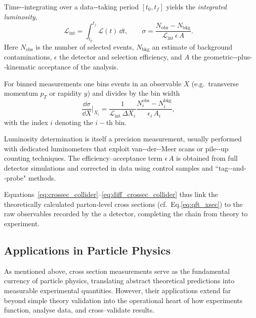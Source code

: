 \begin{definition}
        Time-‑integrating over a data‑-taking period \([t_0, t_f]\) yields the \emph{integrated luminosity},
        \begin{equation}
          \mathcal{L}_{\text{int}}
          = \int_{t_0}^{t_f} \mathcal{L}(t)\,\dd t,
          \qquad
          \sigma
          = \frac{N_{\text{obs}} - N_{\text{bkg}}}
                 {\mathcal{L}_{\text{int}}\,\epsilon\,A}.
          \label{eq:crossec_collider}
        \end{equation}
        Here \(N_{\text{obs}}\) is the number of selected events, \(N_{\text{bkg}}\) an estimate of background contaminations, \(\epsilon\) the detector and selection efficiency, and \(A\) the geometric‑-plus-‑kinematic acceptance of the analysis.

        For binned measurements one bins events in an observable \(X\) (e.g.\ transverse momentum \(p_T\) or rapidity \(y\)) and divides by the bin width
        \begin{equation}
          \frac{\dd\sigma}{\dd X}\Big|_{X_i}
          = \frac{1}{\mathcal{L}_{\text{int}}\,\Delta X_i}
            \frac{N_i^{\text{obs}} - N_i^{\text{bkg}}}
                 {\epsilon_i\,A_i},
          \label{eq:diff_crossec_collider}
        \end{equation}
        with the index \(i\) denoting the \(i-\)th bin.

        Luminosity determination is itself a precision measurement, usually performed with dedicated luminometers that exploit van‑-der-‑Meer
        scans or pile-‑up counting techniques.
        The efficiency–acceptance term \(\epsilon\,A\) is obtained from full detector simulations and corrected in data using control samples and ``tag-‑and-‑probe" methods.

        Equations~\eqref{eq:crossec_collider}–\eqref{eq:diff_crossec_collider} thus link the theoretically calculated parton‑level cross sections (cf.\ Eq.\;\eqref{eq:qft_xsec}) to the raw observables recorded by the a detector, completing the chain from theory to experiment.

    \subsection{Applications in Particle Physics}
        As mentioned above, cross section measurements serve as the fundamental currency of particle physics, translating abstract theoretical predictions into measurable experimental quantities.
        However, their applications extend far beyond simple theory validation into the operational heart of how experiments function, analyse data, and cross--validate results.

\end{definition}
